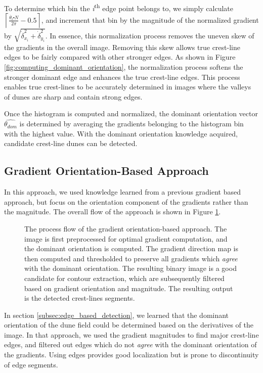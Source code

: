   To determine which bin the \emph{i}\textsuperscript{th} edge point belongs to, we simply calculate $\left\lceil \frac{\dot{\theta_{i}}\centerdot N}{2\pi}-0.5\right\rceil $,	and increment that bin by the magnitude of the normalized gradient	by $\sqrt{\dot{\delta}_{x_{i}}^{2}+\dot{\delta}_{y_{i}}^{2}}$. In essence, this normalization process removes the uneven skew of the gradients in the overall image. Removing this skew allows true crest-line edges to be fairly compared with other stronger edges. As shown in Figure \ref{fig:computing_dominant_orientation}, the normalization process softens the stronger dominant edge and enhances the true crest-line edges. This process enables true crest-lines to be accurately determined in images where the valleys of dunes are sharp and contain strong edges.
  
  Once the histogram is computed and normalized, the dominant orientation vector $\hat{\theta_{dom}}$ is determined by averaging the gradients belonging to the histogram bin with the highest value. With the dominant orientation knowledge acquired, candidate crest-line dunes can be detected.
  


\subsection{Gradient Orientation-Based Approach} \label{subsec:gradient_orientation_based}
In this approach, we used knowledge learned from a previous gradient based approach, but focus on the orientation component of the gradients rather than the magnitude. The overall flow of the approach is shown in Figure \ref{fig:flow_gradient_orientation}. 

\begin{figure}[H]
	\centering
	\caption{The process flow of the gradient orientation-based approach. The image is first preprocessed for optimal gradient computation, and the dominant orientation is computed. The gradient direction map is then computed and thresholded to preserve all gradients which \emph{agree} with the dominant orientation. The resulting binary image is a good candidate for contour extraction, which are subsequently filtered based on gradient orientation and magnitude. The resulting output is the detected crest-lines segments. }
	\label{fig:flow_gradient_orientation}
\end{figure}

In section \ref{subsec:edge_based_detection}, we learned that the dominant orientation of the dune field could be determined based on the derivatives of the image. In that approach, we used the gradient magnitudes to find major crest-line edges, and filtered out edges which do not \emph{agree} with the dominant orientation of the gradients. Using edges provides good localization but is prone to discontinuity of edge segments.

